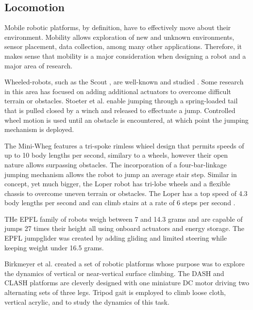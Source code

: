 	\subsection{Locomotion}%
	\label{sec:locomotion} 

		Mobile robotic platforms, by definition, have to effectively move about their environment. Mobility allows exploration of new and unknown environments, sensor placement, data collection, among many other applications. Therefore, it makes sense that mobility is a major consideration when designing a robot and a major area of research. 

		Wheeled-robots, such as the Scout \cite{Rybski2000}, are well-known and studied \cite{Soetanto2003}. Some research in this area has focused on adding additional actuators to overcome difficult terrain or obstacles. Stoeter et al. \cite{Stoeter2006} enable jumping through a spring-loaded tail that is pulled closed by a winch and released to effectuate a jump. Controlled wheel motion is used until an obstacle is encountered, at which point the jumping mechanism is deployed. 

		The Mini-Wheg \cite{Morrey2003} features a tri-spoke rimless whieel design that permits speeds of up to 10 body lengths per second, similary to a wheels, however their open nature allows surpassing obstacles. The incorporation of a four-bar-linkage jumping mechanism allows the robot to jump an average stair step. Similar in concept, yet much bigger, the Loper robot \cite{Herbert2008} has tri-lobe wheels and a flexible chassis to overcome uneven terrain or obstacles. The Loper has a top speed of 4.3 body lengths per second and can climb stairs at a rate of 6 steps per second \cite{Herbert2009}.  


		THe EPFL family of robots \cite{MirkoKovac2010} weigh between 7 and 14.3 grams and are capable of jumps 27 times their height all using onboard actuators and energy storage. The EPFL jumpglider was created by adding gliding and limited steering while keeping weight under 16.5 grams.

		Birkmeyer et al. \cite{Birkmeyer2013} created a set of robotic platforms whose purpose was to explore the dynamics of vertical or near-vertical surface climbing. The DASH and CLASH platforms are cleverly designed with one miniature DC motor driving two alternating sets of three legs. Tripod gait is employed to climb loose cloth, vertical acrylic, and to study the dynamics of this task. 

